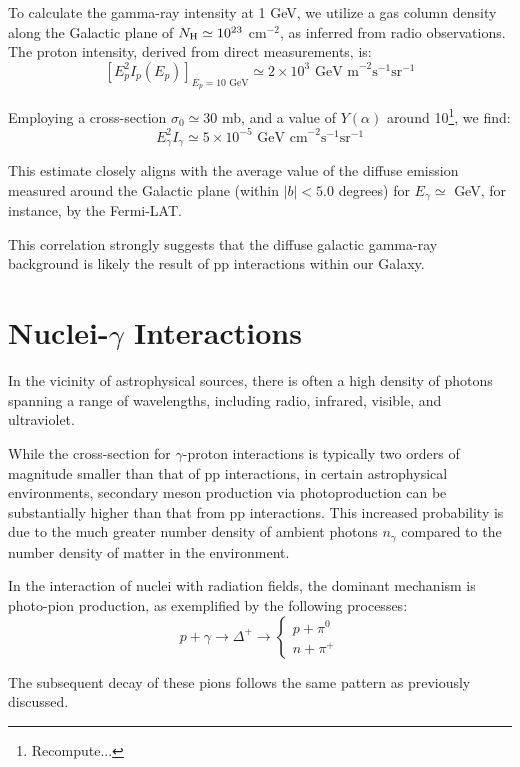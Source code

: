 To calculate the gamma-ray intensity at 1 GeV, we utilize a gas column density along the Galactic plane of \( N_{\rm H} \simeq 10^{23} \) cm\(^{-2}\), as inferred from radio observations. The proton intensity, derived from direct measurements, is:
%
\[
\left[ E_p^2 I_p(E_p) \right]_{E_p = 10 \text{ GeV}} \simeq 2 \times 10^3 \text{ GeV m}^{-2} \text{s}^{-1} \text{sr}^{-1}
\]

Employing a cross-section \( \sigma_0 \simeq 30 \) mb, and {\color{red}a value of \( Y(\alpha) \) around 10}\footnote{Recompute...}, we find:
%
\[
E_\gamma^2 I_\gamma \simeq 5 \times 10^{-5} \text{ GeV cm}^{-2} \text{s}^{-1} \text{sr}^{-1}
\]

This estimate closely aligns with the average value of the diffuse emission measured around the Galactic plane (within \( |b| < 5.0 \) degrees) for \( E_\gamma \simeq \) GeV, for instance, by the Fermi-LAT.

This correlation strongly suggests that the diffuse galactic gamma-ray background is likely the result of pp interactions within our Galaxy.

\section{Nuclei-$\gamma$ Interactions}

In the vicinity of astrophysical sources, there is often a high density of photons spanning a range of wavelengths, including radio, infrared, visible, and ultraviolet.

While the cross-section for \(\gamma\)-proton interactions is typically two orders of magnitude smaller than that of pp interactions, in certain astrophysical environments, secondary meson production via photoproduction can be substantially higher than that from pp interactions. This increased probability is due to the much greater number density of ambient photons \(n_\gamma\) compared to the number density of matter in the environment.

In the interaction of nuclei with radiation fields, the dominant mechanism is photo-pion production, as exemplified by the following processes:
%
\[
p + \gamma \rightarrow \Delta^+ \rightarrow
\begin{cases} 
p + \pi^0 \\
n + \pi^+
\end{cases}
\]

The subsequent decay of these pions follows the same pattern as previously discussed.

